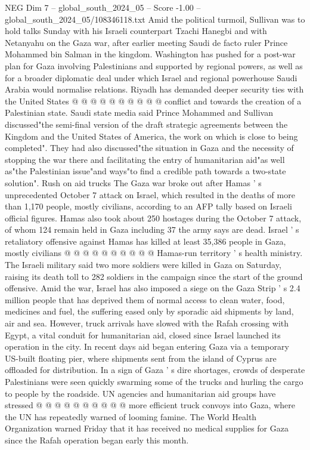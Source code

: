 \begin{textsample}{NEG Dim 7 – global\_south\_2024\_05 – Score -1.00 – global\_south\_2024\_05/108346118.txt}
Amid the political turmoil, Sullivan was to hold talks Sunday with his Israeli counterpart Tzachi Hanegbi and with Netanyahu on the Gaza war, after earlier meeting Saudi de facto ruler Prince Mohammed bin Salman in the kingdom.
Washington has pushed for a post-war plan for Gaza involving Palestinians and supported by regional powers, as well as for a broader diplomatic deal under which Israel and regional powerhouse Saudi Arabia would normalise relations.
Riyadh has demanded deeper security ties with the United States @ @ @ @ @ @ @ @ @ @ conflict and towards the creation of a Palestinian state.
Saudi state media said Prince Mohammed and Sullivan discussed"the semi-final version of the draft strategic agreements between the Kingdom and the United States of America, the work on which is close to being completed".
They had also discussed"the situation in Gaza and the necessity of stopping the war there and facilitating the entry of humanitarian aid"as well as"the Palestinian issue"and ways"to find a credible path towards a two-state solution".
Rush on aid trucks The Gaza war broke out after Hamas ' s unprecedented October 7 attack on Israel, which resulted in the deaths of more than 1,170 people, mostly civilians, according to an AFP tally based on Israeli official figures.
Hamas also took about 250 hostages during the October 7 attack, of whom 124 remain held in Gaza including 37 the army says are dead.
Israel ' s retaliatory offensive against Hamas has killed at least 35,386 people in Gaza, mostly civilians @ @ @ @ @ @ @ @ @ @ Hamas-run territory ' s health ministry.
The Israeli military said two more soldiers were killed in Gaza on Saturday, raising its death toll to 282 soldiers in the campaign since the start of the ground offensive.
Amid the war, Israel has also imposed a siege on the Gaza Strip ' s 2.4 million people that has deprived them of normal access to clean water, food, medicines and fuel, the suffering eased only by sporadic aid shipments by land, air and sea.
However, truck arrivals have slowed with the Rafah crossing with Egypt, a vital conduit for humanitarian aid, closed since Israel launched its operation in the city.
In recent days aid began entering Gaza via a temporary US-built floating pier, where shipments sent from the island of Cyprus are offloaded for distribution.
In a sign of Gaza ' s dire shortages, crowds of desperate Palestinians were seen quickly swarming some of the trucks and hurling the cargo to people by the roadside.
UN agencies and humanitarian aid groups have stressed @ @ @ @ @ @ @ @ @ @ more efficient truck convoys into Gaza, where the UN has repeatedly warned of looming famine.
The World Health Organization warned Friday that it has received no medical supplies for Gaza since the Rafah operation began early this month.

\end{textsample}
